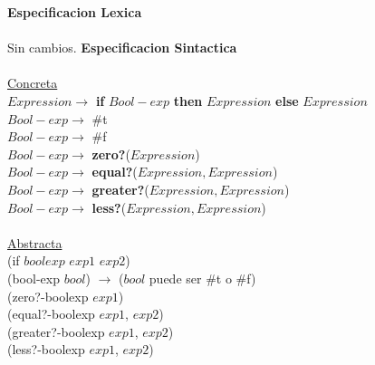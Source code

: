 \documentclass{article}
\begin{document}
\begin{itemize}
\begin{center}
    \end{center}
    \textbf{Especificacion Lexica}\\
    \\
    \hspace*{10mm} Sin cambios.
    \newpage
    \textbf{Especificacion Sintactica}\\
    \\
    \hspace*{10mm} \underline{Concreta}\\
    \hspace*{10mm} $Expression\rightarrow$ \textbf{if} $Bool-exp$ \textbf{then} $Expression$ \textbf{else} $Expression$\\
    \hspace*{10mm} $Bool-exp\rightarrow$ \#t\\
    \hspace*{10mm} $Bool-exp\rightarrow$ \#f\\
    \hspace*{10mm} $Bool-exp\rightarrow$ \textbf{zero?}($Expression$)\\   
    \hspace*{10mm} $Bool-exp\rightarrow$ \textbf{equal?}($Expression,Expression$)\\
    \hspace*{10mm} $Bool-exp\rightarrow$ \textbf{greater?}($Expression,Expression$)\\
    \hspace*{10mm} $Bool-exp\rightarrow$ \textbf{less?}($Expression,Expression$)\\
    \\
    \hspace*{10mm} \underline{Abstracta}\\
    \hspace*{10mm} (if $boolexp$ $exp1$ $exp2$)\\
    \hspace*{10mm} (bool-exp $bool$)\hspace{10mm} $\rightarrow$ ($bool$ puede ser \#t o \#f)\\
    \hspace*{10mm} (zero?-boolexp $exp1$)\\
    \hspace*{10mm} (equal?-boolexp $exp1$, $exp2$)\\
    \hspace*{10mm} (greater?-boolexp $exp1$, $exp2$)\\
    \hspace*{10mm} (less?-boolexp $exp1$, $exp2$)\\

\end{itemize}
\end{document}
